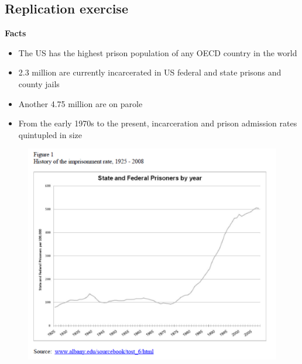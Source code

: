 \documentclass[notes=show]{beamer}
\begin{document}
\subsection{Replication exercise}



\begin{frame}
\begin{center}
\textbf{Facts}
\end{center}
	
	\begin{itemize}
	\item The US has the highest prison population of any OECD country in the world 
	\item 2.3 million are currently incarcerated in US federal and state prisons and county jails
	\item Another 4.75 million are on parole
	\item From the early 1970s to the present, incarceration and prison admission rates quintupled in size
	\end{itemize}
\end{frame}



\begin{frame}[plain]

\begin{figure}
\includegraphics[scale=0.5]{./lecture_includes/cook2010.pdf}
\end{figure}
\end{frame}
\end{document}
